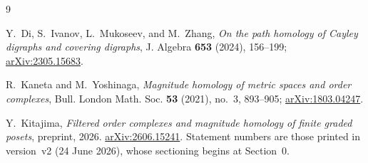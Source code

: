 \documentclass[11pt]{amsart}
\begin{document}
\begin{thebibliography}{9}

Y.~Di, S.~Ivanov, L.~Mukoseev, and M.~Zhang,
\emph{On the path homology of Cayley digraphs and covering digraphs},
J. Algebra \textbf{653} (2024), 156--199;
\href{https://arxiv.org/abs/2305.15683}{arXiv:2305.15683}.

R.~Kaneta and M.~Yoshinaga,
\emph{Magnitude homology of metric spaces and order complexes},
Bull. London Math. Soc. \textbf{53} (2021), no.~3, 893--905;
\href{https://arxiv.org/abs/1803.04247}{arXiv:1803.04247}.

Y.~Kitajima,
\emph{Filtered order complexes and magnitude homology of finite graded
posets},
preprint, 2026.
\href{https://arxiv.org/abs/2606.15241}{arXiv:2606.15241}.
Statement numbers are those printed in version~v2 (24 June 2026), whose
sectioning begins at Section~0.

\end{thebibliography}
\end{document}
